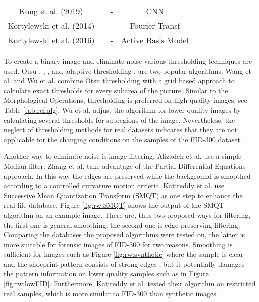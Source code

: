 \documentclass[draft,final]{vutinfth} %
\begin{document}
\begin{sidewaystable}
\begin{minipage}{\linewidth}
\begin{tabular}{c|c|c|c}
Kong et al. (2019) \cite{kong2019cross} & & - & CNN \\
Kortylewski et al. (2014) \cite{kortylewski2014unsupervised} & & - & Fourier Transf \\
Kortylewski et al. (2016) \cite{kortylewski2016probabilistic} & & - & Active Basis Model \\
\end{tabular}
\label{tab:ref:alg} 
\end{minipage}
\end{sidewaystable}

\par
To create a binary image and eliminate noise various thresholding techniques are used.
Otsu  \cite{wu2019crime}, \cite{algarni2008novel}, \cite{alizadeh2017automatic}, \cite{kong2014novel} and adaptive thresholding \cite{wang2014automatic}, \cite{li2014retrieval} are two popular algorithms.
Wang et al. \cite{wang2014automatic} and Wu et al. \cite{wu2019crime} combine Otsu thresholding with a grid based approach to calculate exact thresholds for every subarea of the picture.
Similar to the Morphological Operations, thresholding is preferred on high quality images, see Table \ref{tab:ref:alg}.
Wu et al. \cite{wu2019crime} adjust the algorithm for lower quality images by calculating several thresholds for subregions of the image.
Nevertheless, the neglect of thresholding methods for real datasets indicates that they are not applicable for the changing conditions on the samples of the FID-300 dataset.
     
\par
Another way to eliminate noise is image filtering.
Alizadeh et al. \cite{alizadeh2017automatic} use a simple Median filter.
Zhang et al. \cite{zhang2005automatic} take advantage of the Partial Differential Equations approach.
In this way the edges are preserved while the background is smoothed according to a controlled curvature motion criteria. 
Katireddy et al. \cite{katireddy2017novel} use Successive Mean Quantization Transform (SMQT) \cite{nilsson2013smqt} as one step to enhance the real-life database.
Figure \ref{fig:rw:SMQT} shows the output of the SMQT algorithm on an example image.
There are, thus two proposed ways for filtering, the first one is general smoothing, the second one is edge preserving filtering.
Comparing the databases the proposed algorithms were tested on, the latter is more suitable for forensic images of FID-300 for two reasons.
Smoothing is sufficient for images such as Figure \ref{fig:rw:synthetic} where the sample is clear and the shoeprint pattern consists of strong edges \cite{alizadeh2017automatic}, but it potentially damages the pattern information on lower quality samples such as in Figure \ref{fig:rw:lowFID}.
Furthermore, Katireddy et al. \cite{katireddy2017novel} tested their algorithm on restricted real samples, which is more similar to FID-300 than synthetic images. 
\end{document}
